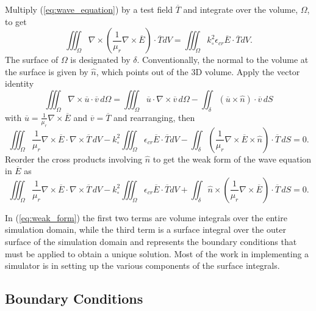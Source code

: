 \documentclass[titlepage]{article}
\renewcommand\_{\textunderscore\linebreak[1]}
\begin{document}
Multiply (\ref{eq:wave_equation}) by a test field $\overline{T}$ and integrate over the volume, $\Omega$, to get 
\begin{equation}
\iiint_{\Omega}\nabla\times(\frac{1}{\mu_r}\nabla\times\overline{E})\cdot\overline{T}dV=\iiint_{\Omega} k_\circ^2\epsilon_{cr}\overline{E}\cdot\overline{T}dV.
\end{equation}
The surface of $\Omega$ is designated by $\delta$.  Conventionally, the normal to the volume at the surface is given by $\hat{n}$, which points out of the 3D volume.  Apply the vector identity
\begin{equation}
\iiint_{\Omega}\nabla\times\overline{u}\cdot\overline{v}\,d\Omega=\iiint_{\Omega}\overline{u}\cdot\nabla\times\overline{v}\,d\Omega-\iint_{\delta}(\overline{u}\times\hat{n})\cdot\overline{v}\,dS
\end{equation}
with $\overline{u}=\frac{1}{\mu_r}\nabla\times\overline{E}$ and $\overline{v}=\overline{T}$ and rearranging, then
\begin{equation}
\iiint_{\Omega}\frac{1}{\mu_r}\nabla\times\overline{E}\cdot\nabla\times\overline{T}\,dV-k_\circ^2\iiint_{\Omega}\epsilon_{cr}\overline{E}\cdot\overline{T}dV-\iint_{\delta}(\frac{1}{\mu_r}\nabla\times\overline{E}\times\hat{n})\cdot\overline{T}\,dS=0.
\end{equation}
Reorder the cross products involving $\hat{n}$ to get the weak form of the wave equation in $\overline{E}$ as
\begin{equation}
\label{eq:weak_form}
\iiint_{\Omega}\frac{1}{\mu_r}\nabla\times\overline{E}\cdot\nabla\times\overline{T}\,dV-k_\circ^2\iiint_{\Omega}\epsilon_{cr}\overline{E}\cdot\overline{T}dV+\iint_{\delta}\hat{n}\times(\frac{1}{\mu_r}\nabla\times\overline{E})\cdot\overline{T}\,dS=0.
\end{equation}

In (\ref{eq:weak_form}) the first two terms are volume integrals over the entire simulation domain, while the third term is a surface integral over the outer surface of the simulation domain and represents the boundary conditions that must be applied to obtain a unique solution.  Most of the work in implementing a simulator is in setting up the various components of the surface integrals.

\subsection{Boundary Conditions}
\end{document}
